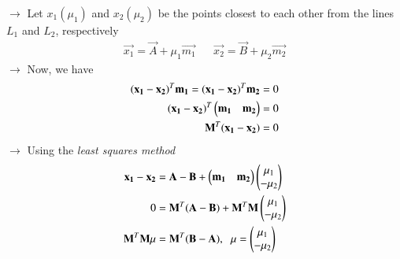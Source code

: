 \documentclass[journal]{IEEEtran}
\begin{document}
$\longrightarrow$ Let $x_1(\mu_1)$ and $x_2(\mu_2)$ be the points closest to each other from the lines $L_1$ and $L_2$, respectively
\begin{align}
     \vec{x_1} = \vec{A} + \mu_1\vec{m_1} &&
     \vec{x_2} = \vec{B} + \mu_2\vec{m_2}
\end{align}
$\rightarrow$ Now, we have
\begin{align}
    (\mathbf{x_1}-\mathbf{x_2})^T\mathbf{m_1} = (\mathbf{x_1}-\mathbf{x_2})^T\mathbf{m_2} = 0 \\
    (\mathbf{x_1}-\mathbf{x_2})^T \begin{pmatrix}\mathbf{m_1}&\mathbf{m_2}\end{pmatrix} = 0\\
    \mathbf{M}^T (\mathbf{x_1}-\mathbf{x_2}) = 0
\end{align}
$\rightarrow$ Using the \textit{least squares method}
\begin{align}
    \mathbf{x_1}-\mathbf{x_2} &= \mathbf{A}-\mathbf{B}+\begin{pmatrix}\mathbf{m_1}&\mathbf{m_2}\end{pmatrix}\begin{pmatrix}\mu_1\\-\mu_2\end{pmatrix} \\
    0 &= \mathbf{M}^T(\mathbf{A}-\mathbf{B})+\mathbf{M}^T\mathbf{M}\begin{pmatrix}\mu_1\\-\mu_2\end{pmatrix} \\
    \mathbf{M}^T\mathbf{M}\mathbf{\mu} &= \mathbf{M}^T(\mathbf{B}-\mathbf{A}),\hspace{0.2cm} \mathbf{\mu} = \begin{pmatrix}\mu_1\\-\mu_2\end{pmatrix}
\end{align}
\end{document}
